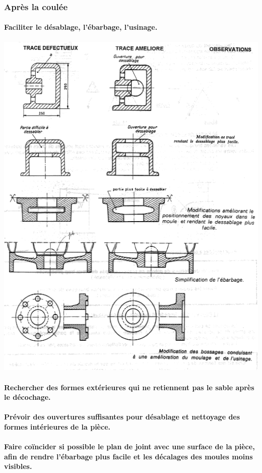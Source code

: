 \documentclass[11pt,oneside]{article}
\begin{document}
\subsubsection*{Après la coulée} 


\paragraph*{Faciliter le désablage, l'ébarbage, l'usinage.}

\begin{center}
 \includegraphics[width=.8\textwidth]{png/regles_ebarbage}
\end{center}

\paragraph*{Rechercher des formes extérieures qui ne retiennent pas le sable
après le décochage.}

\paragraph*{Prévoir des ouvertures suffisantes pour désablage et nettoyage des
formes intérieures de la pièce.}

\paragraph*{Faire coïncider si possible le plan de joint avec une surface de la
pièce, afin de rendre l'ébarbage plus facile et les décalages des moules moins
visibles.}
\end{document}
